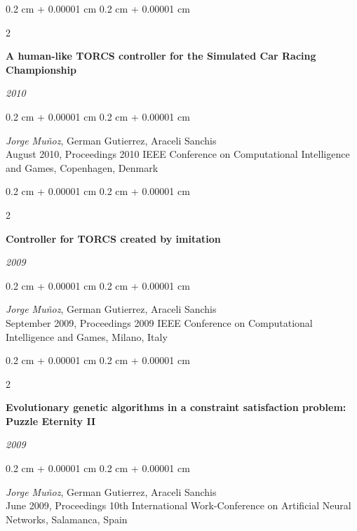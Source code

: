 \documentclass[10pt, letterpaper]{article}
\newenvironment{onecolentry}{
	\begin{adjustwidth}{
		0.2 cm + 0.00001 cm
	}{
		0.2 cm + 0.00001 cm
	}
	}{
	\end{adjustwidth}
} %
\newenvironment{twocolentry}[2][]{
	\onecolentry
	\def\secondColumn{#2}
	\setcolumnwidth{\fill, 5.5 cm}
	\begin{paracol}{2}
	}{
		\switchcolumn \raggedleft \secondColumn
	\end{paracol}
	\endonecolentry
} %
\let\hrefWithoutArrow\href
\renewcommand{\href}[2]{\hrefWithoutArrow{#1}{\ifthenelse{\equal{#2}{}}{ }{#2 }\raisebox{.15ex}{\footnotesize \faExternalLink*}}}
\begin{document}
	\vspace{0.10 cm}

	\begin{twocolentry}{
		\textit{2010}}
		\textbf{A human-like TORCS controller for the Simulated Car Racing Championship}
	\end{twocolentry}

	\vspace{0.10 cm}
	\begin{onecolentry}
		\textit{Jorge Muñoz}, German Gutierrez, Araceli Sanchis\\
		August 2010, Proceedings 2010 IEEE Conference on Computational Intelligence and Games, Copenhagen, Denmark\\
		\href{https://www.researchgate.net/profile/Araceli_Sanchis_de_Miguel/publication/224180055_A_human-like_TORCS_controller_for_the_Simulated_Car_Racing_Championship/links/00b49517e8be6dfb2d000000.pdf}{[PDF]}
	\end{onecolentry}

	\vspace{0.2 cm}

	\begin{twocolentry}{
		\textit{2009}}
		\textbf{Controller for TORCS created by imitation}
	\end{twocolentry}

	\vspace{0.10 cm}
	\begin{onecolentry}
		\textit{Jorge Muñoz}, German Gutierrez, Araceli Sanchis\\
		September 2009, Proceedings 2009 IEEE Conference on Computational Intelligence and Games, Milano, Italy\\
		\href{https://pdfs.semanticscholar.org/4d2a/6c31ff196e6b40072ea7b6604cec2507e41d.pdf}{[PDF]}
	\end{onecolentry}

	\vspace{0.10 cm}

	\begin{twocolentry}{
		\textit{2009}}
		\textbf{Evolutionary genetic algorithms in a constraint satisfaction problem: Puzzle Eternity II}
	\end{twocolentry}

	\vspace{0.10 cm}
	\begin{onecolentry}
		\textit{Jorge Muñoz}, German Gutierrez, Araceli Sanchis\\
		June 2009, Proceedings 10th International Work-Conference on Artificial Neural Networks, Salamanca, Spain\\
		\href{https://core.ac.uk/download/pdf/30043152.pdf}{[PDF]}
	\end{onecolentry}
\end{document}
